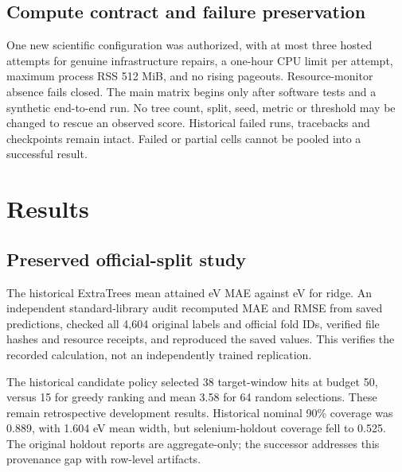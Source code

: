 \documentclass[11pt]{article}
\begin{document}
\subsection{Compute contract and failure preservation}
One new scientific configuration was authorized, with at most three hosted attempts for genuine infrastructure repairs, a one-hour CPU limit per attempt, maximum process RSS 512 MiB, and no rising pageouts. Resource-monitor absence fails closed. The main matrix begins only after software tests and a synthetic end-to-end run. No tree count, split, seed, metric or threshold may be changed to rescue an observed score. Historical failed runs, tracebacks and checkpoints remain intact. Failed or partial cells cannot be pooled into a successful result.

\section{Results}
\subsection{Preserved official-split study}

The historical ExtraTrees mean attained \VOneMAE{} eV MAE against \VOneRidge{} eV for ridge. An independent standard-library audit recomputed MAE and RMSE from saved predictions, checked all 4,604 original labels and official fold IDs, verified file hashes and resource receipts, and reproduced the saved values. This verifies the recorded calculation, not an independently trained replication.

The historical candidate policy selected 38 target-window hits at budget 50, versus 15 for greedy ranking and mean 3.58 for 64 random selections. These remain retrospective development results. Historical nominal 90\% coverage was 0.889, with 1.604 eV mean width, but selenium-holdout coverage fell to 0.525. The original holdout reports are aggregate-only; the successor addresses this provenance gap with row-level artifacts.
\end{document}
